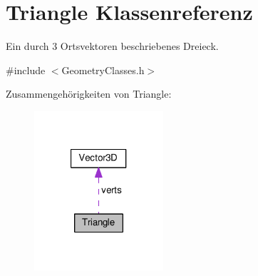 \hypertarget{classTriangle}{\section{Triangle Klassenreferenz}
\label{classTriangle}
}


Ein durch 3 Ortsvektoren beschriebenes Dreieck.  




{\ttfamily \#include $<$Geometry\-Classes.\-h$>$}



Zusammengehörigkeiten von Triangle\-:\nopagebreak
\begin{figure}[H]
\begin{center}
\leavevmode
\includegraphics[width=136pt]{classTriangle__coll__graph}
\end{center}
\end{figure}

